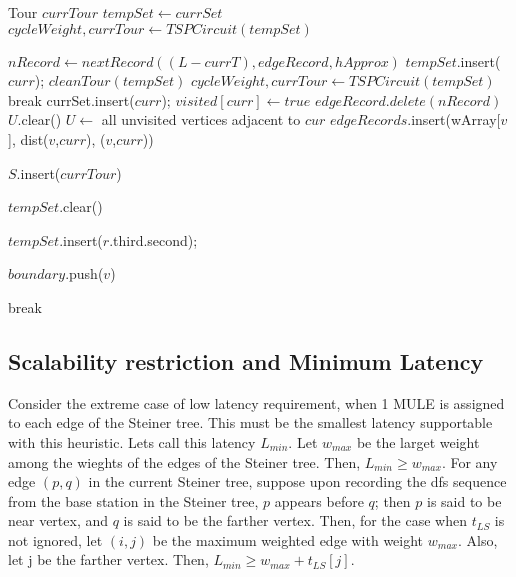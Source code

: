 \begin{algorithm}
\begin{algorithmic}
	
	\State Tour $currTour$ 
	\State $tempSet \gets currSet$ 
	\State $cycleWeight , currTour \gets TSPCircuit(tempSet)$ 

		\State $nRecord \gets nextRecord((L-currT),edgeRecord,hApprox)$
		\State $tempSet$.insert($curr$);
		\State $cleanTour(tempSet)$
		\State $cycleWeight, currTour \gets TSPCircuit(tempSet)$ 
			\State break 
		\EndIf
		\State currSet.insert($curr$);
		\State $visited[curr] \gets true$ 
		\State $edgeRecord.delete(nRecord)$
		\State $U$.clear() 
		\State $U  \gets$ all unvisited vertices adjacent to $cur$ 
			\State $edgeRecords$.insert(wArray[$v$], dist($v$,$curr$), ($v$,$curr$)) 
		\EndFor
	\EndWhile
	
	\State $S$.insert($currTour$) 
	
	\State $tempSet$.clear()
	
		\State $tempSet$.insert($r$.third.second);		
	\EndFor

		$boundary$.push($v$)
	\EndFor
	
		\State break
	\EndIf

\EndWhile
\EndFunction

\EndFunction

\EndFunction

\end{algorithmic}
\end{algorithm}

\subsection{Scalability restriction and Minimum Latency}
Consider the extreme case of low latency requirement, when 1 MULE is assigned to each edge of the Steiner tree. This must be the smallest latency supportable with this heuristic. Lets call this latency $L_{min}$. Let $w_{max}$ be the larget weight among the wieghts of the edges of the Steiner tree. Then, $L_{min} \ge w_{max}$.
For any edge $(p,q)$ in the current Steiner tree, suppose upon recording the dfs sequence from the base station in the Steiner tree, $p$ appears before $q$; then $p$ is said to be near vertex, and $q$ is said to be the farther vertex. Then, for the case when $t_{LS}$ is not ignored, let $(i,j)$ be the maximum weighted edge with weight $w_{max}$. Also, let j be the farther 
vertex. Then, $L_{min} \ge w_{max}+t_{LS}[j]$.

